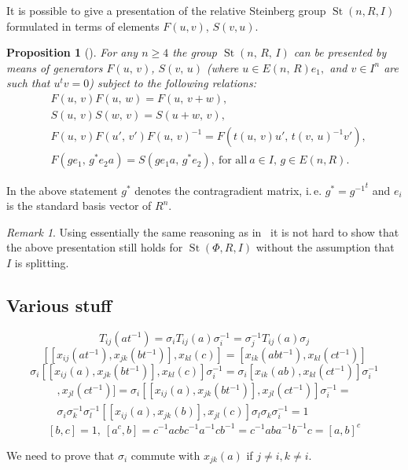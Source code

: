 \documentclass[oneside, 10pt]{amsart}
\DeclareMathOperator{\St}{St}
\numberwithin{equation}{section}
\numberwithin{lemma}{section}
\newtheorem{prop}[lemma]{Proposition}
\theoremstyle{definition}
\theoremstyle{remark}
\newtheorem{rem}[lemma]{Remark}
\begin{document}
It is possible to give a presentation of the relative Steinberg group $\St(n, R, I)$ formulated in terms of elements $F(u, v)$, $S(v, u)$.
\begin{prop}[] \label{prop:rel-presentation}
 For any $n\geq 4$ the group $\St(n,\,R,\,I)$ can be presented by means of generators $F(u,\,v)$, $S(v,\,u)$ (where $u\in E(n,\,R)e_1,$ and $v\in I^n$ are such that $u^tv=0$) subject to the following relations:
\begin{align}
&F(u,\,v)F(u,\,w)=F(u,\,v+w), \label{add4}\\
&S(u,\,v)S(w,\,v)=S(u+w,\,v), \label{add5}\\
&F(u,\,v)F(u',\,v')F(u,\,v)^{-1}=F(t(u,\,v)u',\,t(v,\,u)^{-1} v'), \label{conj3} \\
&F(ge_1,\,g^*e_2a)=S(ge_1a,\,g^*e_2),\ \text{for all}\ a\in I,\, g \in E(n, R).
\end{align}
\end{prop}
In the above statement $g^*$ denotes the contragradient matrix, i.\,e. $g^* = {g^{-1}}^t$ and $e_i$ is the standard basis vector of $R^n$.
\begin{rem}
Using essentially the same reasoning as in~\cite[Proposition~8]{S15} it is not hard to show that the above presentation still holds for $\St(\Phi, R, I)$ without the assumption that $I$ is splitting.
\end{rem}



\subsection{Various stuff}
\[ T_{ij}(at^{-1}) = \sigma_i T_{ij}(a) \sigma_i^{-1} = \sigma_j^{-1} T_{ij}(a) \sigma_j \]
\[ [[x_{ij}(a t^{-1}), x_{jk}(b t^{-1})],  x_{kl}(c)] = [x_{ik}(a b t^{-1}),  x_{kl}(c t^{-1})] \]
\[ \sigma_i [[x_{ij}(a), x_{jk}(b t^{-1})],  x_{kl}(c)] \sigma_i^{-1} =  \sigma_i [x_{ik}(a b),  x_{kl}(c t^{-1})] \sigma_i^{-1} \]
\begin{multline}
[[x_{ij}(at^{-1}), x_{jk}(bt^{-1})], x_{jl}(ct^{-1})] = \sigma_i [[ x_{ij}(a), x_{jk}(bt^{-1})], x_{jl}(ct^{-1})] \sigma_i^{-1} = \\
\sigma_i \sigma_k^{-1} \sigma_l^{-1} [[ x_{ij}(a), x_{jk}(b)], x_{jl}(c)] \sigma_l \sigma_k \sigma_i^{-1} = 1
\end{multline}
\[ [b, c] =1,\ [a^c, b] = c^{-1} a c b c^{-1} a^{-1} c b^{-1} =  c^{-1} a b  a^{-1} b^{-1} c = [a, b]^c \]

We need to prove that $\sigma_i$ commute with $x_{jk}(a)$ if $j\neq i, k \neq i$.
\end{document}
